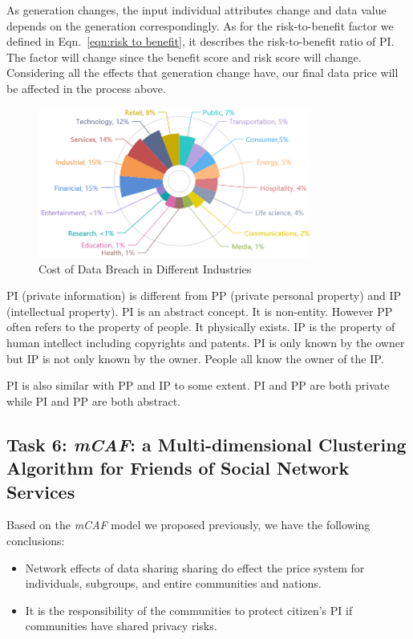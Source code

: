 \documentclass{mcmthesis}
\begin{document}
As generation changes, the input individual attributes change and data value depends on the generation correspondingly. As for the risk-to-benefit factor we defined in Eqn.~\eqref{eqn:risk to benefit}, it describes the risk-to-benefit ratio of PI. The factor will change since the benefit score and risk score will change.  Considering all the effects that generation change have, our final data price will be affected in the process above. 
\begin{figure}
    \centering
    \includegraphics[width=0.8\textwidth]{fig/cost-of-industry.png}
    \caption{Cost of Data Breach in Different Industries}
    \label{fig:breach-industry}
\end{figure}
PI (private information) is different from PP (private personal property) and IP (intellectual property). PI is an abstract concept. It is non-entity. However PP often refers to the property of people. It physically exists. IP is the property of human intellect including copyrights and patents. PI is only known by the owner but IP is not only known by the owner. People all know the owner of the IP.

PI is also similar with PP and IP to some extent. PI and PP are both private while PI and PP are both abstract.

\subsection{Task 6: \emph{mCAF}: a Multi-dimensional Clustering Algorithm for Friends of Social Network Services}

Based on the \emph{mCAF} model we proposed previously, we have the following conclusions:
\begin{itemize}
\item Network effects of data sharing sharing do effect the price system for individuals, subgroups, and entire communities and nations.
\item It is the responsibility of the communities to protect citizen's PI if communities have shared privacy risks.
\end{itemize}
\end{document}
